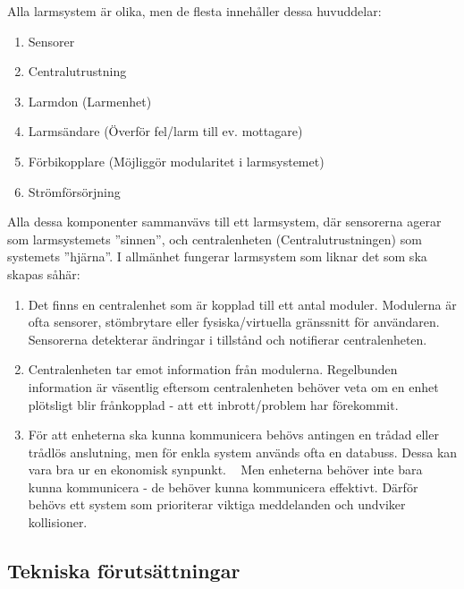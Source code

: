\documentclass[a4paper]{article}
\begin{document}
Alla larmsystem är olika, men de flesta innehåller dessa huvuddelar: 
\begin{enumerate} 
    \item Sensorer
    \item Centralutrustning 
    \item Larmdon (Larmenhet)
    \item Larmsändare (Överför fel/larm till ev. mottagare)
    \item Förbikopplare (Möjliggör modularitet i larmsystemet)
    \item Strömförsörjning
\begin{flushright}
   \cite[pg 15]{lundh:2008}
\end{flushright}

\end{enumerate}
Alla dessa komponenter sammanvävs till ett larmsystem, där sensorerna agerar som larmsystemets ''sinnen'', och centralenheten (Centralutrustningen) som systemets ''hjärna''. 
I allmänhet fungerar larmsystem som liknar det som ska skapas såhär:

\begin{enumerate}
 \item Det finns en centralenhet som är kopplad till ett antal moduler. Modulerna är ofta sensorer, stömbrytare eller fysiska/virtuella gränssnitt för användaren. Sensorerna detekterar ändringar i tillstånd och notifierar centralenheten.


 \item Centralenheten tar emot information från modulerna. Regelbunden information är väsentlig eftersom centralenheten behöver veta om en enhet plötsligt blir frånkopplad - att ett inbrott/problem har förekommit.
 \item För att enheterna ska kunna kommunicera behövs antingen en trådad eller trådlös anslutning, men för enkla system används ofta en databuss. Dessa kan vara bra ur en ekonomisk synpunkt. \ \cite[pg 16, pgrph 2]{lundh:2008} Men enheterna behöver inte bara kunna kommunicera - de behöver kunna kommunicera effektivt. Därför behövs ett system som prioriterar viktiga meddelanden och undviker kollisioner. 
 
\end{enumerate}
\newpage
\subsection{Tekniska förutsättningar}
\label{sec:tekniska förutsättningar}
\end{document}
